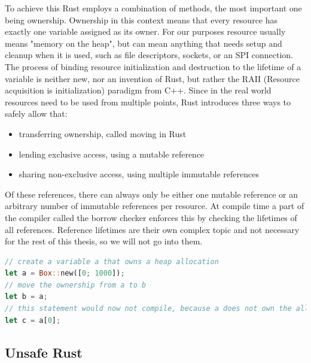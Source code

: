 To achieve this Rust employs a combination of methods, the most important one being ownership.
Ownership in this context means that every resource has exactly one variable assigned as its owner.
For our purposes resource usually means "memory on the heap",
but can mean anything that needs setup and cleanup when it is used,
such as file descriptors, sockets, or an SPI connection.
The process of binding resource initialization and destruction to the lifetime of a variable is neither new,
nor an invention of Rust,
but rather the RAII (Resource acquisition is initialization) paradigm from C++.
Since in the real world resources need to be used from multiple points, Rust introduces three ways to safely allow that:
\begin{itemize}
    \item transferring ownership, called moving in Rust
    \item lending exclusive access, using a mutable reference
    \item sharing non-exclusive access, using multiple immutable references
\end{itemize}

Of these references, there can always only be either one mutable reference or an arbitrary number of immutable references per resource.
At compile time a part of the compiler called the borrow checker enforces this by checking the lifetimes of all references.
Reference lifetimes are their own complex topic and not necessary for the rest of this thesis, so we will not go into them.

\begin{lstlisting}[language=Rust,style=colouredRust]
// create a variable a that owns a heap allocation
let a = Box::new([0; 1000]);
// move the ownership from a to b
let b = a;
// this statement would now not compile, because a does not own the allocation anymore
let c = a[0];
\end{lstlisting}

\subsection{Unsafe Rust}
\label{sec:background:rust:unsafe}

